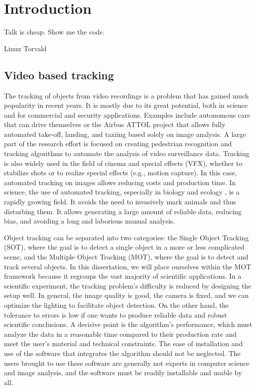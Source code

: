 \chapter{Introduction}

  \epigraph{Talk is cheap. Show me the code.}{Linux Torvald}

	\section{Video based tracking}
    The tracking of objects from video recordings is a problem that has gained much popularity in recent years. It is mostly due to its great potential, both in science and for commercial and security applications. Examples include autonomous cars that can drive themselves or the Airbus ATTOL project that allows fully automated take-off, landing, and taxiing based solely on image analysis. A large part of the research effort is focused on creating pedestrian recognition and tracking algorithms to automate the analysis of video surveillance data. Tracking is also widely used in the field of cinema and special effects (VFX), whether to stabilize shots or to realize special effects (e.g., motion capture). In this case, automated tracking on images allows reducing costs and production time. In science, the use of automated tracking, especially in biology and ecology \cite{dell2014automated}, is a rapidly growing field. It avoids the need to invasively mark animals and thus disturbing them. It allows generating a large amount of reliable data, reducing bias, and avoiding a long and laborious manual analysis.

    Object tracking can be separated into two categories: the Single Object Tracking (SOT), where the goal is to detect a single object in a more or less complicated scene, and the Multiple Object Tracking (MOT), where the goal is to detect and track several objects. In this dissertation, we will place ourselves within the MOT framework because it regroups the vast majority of scientific applications. In a scientific experiment, the tracking problem's difficulty is reduced by designing the setup well. In general, the image quality is good, the camera is fixed, and we can optimize the lighting to facilitate object detection. On the other hand, the tolerance to errors is low if one wants to produce reliable data and robust scientific conclusions. A decisive point is the algorithm's performance, which must analyze the data in a reasonable time compared to their production rate and meet the user's material and technical constraints. The ease of installation and use of the software that integrates the algorithm should not be neglected. The users brought to use these software are generally not experts in computer science and image analysis, and the software must be readily installable and usable by all.

